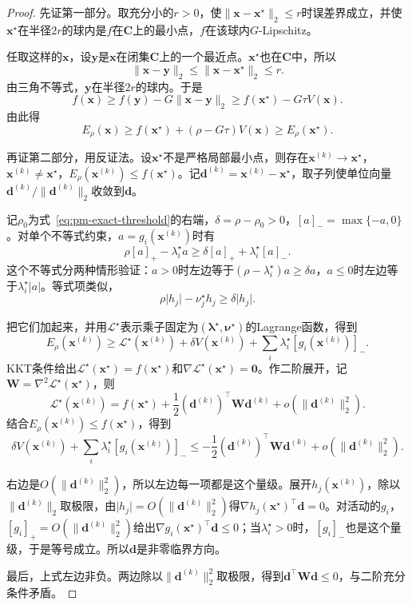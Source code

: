 \begin{proof}
先证第一部分。取充分小的$r>0$，使$\lVert\bm{x}-\bm{x}^\star\rVert_2\leq r$时误差界成立，并使$\bm{x}^\star$在半径$2r$的球内是$f$在$\bm{C}$上的最小点，$f$在该球内$G$-Lipschitz。

任取这样的$\bm{x}$，设$\bm{y}$是$\bm{x}$在闭集$\bm{C}$上的一个最近点。$\bm{x}^\star$也在$\bm{C}$中，所以
\[
 \lVert\bm{x}-\bm{y}\rVert_2\leq\lVert\bm{x}-\bm{x}^\star\rVert_2\leq r .
\]
由三角不等式，$\bm{y}$在半径$2r$的球内。于是
\[
 f(\bm{x})\geq f(\bm{y})-G\lVert\bm{x}-\bm{y}\rVert_2\geq f(\bm{x}^\star)-G\tau V(\bm{x}).
\]
由此得
\[
 E_\rho(\bm{x})\geq f(\bm{x}^\star)+(\rho-G\tau)V(\bm{x})\geq E_\rho(\bm{x}^\star).
\]

再证第二部分，用反证法。设$\bm{x}^\star$不是严格局部最小点，则存在$\bm{x}^{(k)}\to\bm{x}^\star$，$\bm{x}^{(k)}\neq\bm{x}^\star$，$E_\rho(\bm{x}^{(k)})\leq f(\bm{x}^\star)$。记$\bm{d}^{(k)}=\bm{x}^{(k)}-\bm{x}^\star$，取子列使单位向量$\bm{d}^{(k)}/\lVert\bm{d}^{(k)}\rVert_2$收敛到$\bm{d}$。

记$\rho_0$为式~\eqref{eq:pm-exact-threshold}的右端，$\delta=\rho-\rho_0>0$，$[a]_-=\max\{-a,0\}$。对单个不等式约束，$a=g_i(\bm{x}^{(k)})$时有
\[
 \rho[a]_+-\lambda_i^\star a\geq\delta[a]_++\lambda_i^\star[a]_- .
\]
这个不等式分两种情形验证：$a>0$时左边等于$(\rho-\lambda_i^\star)a\geq\delta a$，$a\leq0$时左边等于$\lambda_i^\star\lvert a\rvert$。等式项类似，
\[
 \rho\lvert h_j\rvert-\nu_j^\star h_j\geq\delta\lvert h_j\rvert .
\]

把它们加起来，并用$\mathcal{L}^\star$表示乘子固定为$(\bm{\lambda}^\star,\bm{\nu}^\star)$的Lagrange函数，得到
\[
 E_\rho(\bm{x}^{(k)})\geq\mathcal{L}^\star(\bm{x}^{(k)})+\delta V(\bm{x}^{(k)})+\sum_i\lambda_i^\star[g_i(\bm{x}^{(k)})]_- .
\]
KKT条件给出$\mathcal{L}^\star(\bm{x}^\star)=f(\bm{x}^\star)$和$\nabla\mathcal{L}^\star(\bm{x}^\star)=\bm{0}$。作二阶展开，记$\bm{W}=\nabla^2\mathcal{L}^\star(\bm{x}^\star)$，则
\[
 \mathcal{L}^\star(\bm{x}^{(k)})=f(\bm{x}^\star)+\frac12(\bm{d}^{(k)})^\top\bm{W}\bm{d}^{(k)}+o(\lVert\bm{d}^{(k)}\rVert_2^2).
\]
结合$E_\rho(\bm{x}^{(k)})\leq f(\bm{x}^\star)$，得到
\[
 \delta V(\bm{x}^{(k)})+\sum_i\lambda_i^\star[g_i(\bm{x}^{(k)})]_-
 \leq-\frac12(\bm{d}^{(k)})^\top\bm{W}\bm{d}^{(k)}+o(\lVert\bm{d}^{(k)}\rVert_2^2).
\]

右边是$O(\lVert\bm{d}^{(k)}\rVert_2^2)$，所以左边每一项都是这个量级。展开$h_j(\bm{x}^{(k)})$，除以$\lVert\bm{d}^{(k)}\rVert_2$取极限，由$\lvert h_j\rvert=O(\lVert\bm{d}^{(k)}\rVert_2^2)$得$\nabla h_j(\bm{x}^\star)^\top\bm{d}=0$。对活动的$g_i$，$[g_i]_+=O(\lVert\bm{d}^{(k)}\rVert_2^2)$给出$\nabla g_i(\bm{x}^\star)^\top\bm{d}\leq0$；当$\lambda_i^\star>0$时，$[g_i]_-$也是这个量级，于是等号成立。所以$\bm{d}$是非零临界方向。

最后，上式左边非负。两边除以$\lVert\bm{d}^{(k)}\rVert_2^2$取极限，得到$\bm{d}^\top\bm{W}\bm{d}\leq0$，与二阶充分条件矛盾。
\end{proof}

